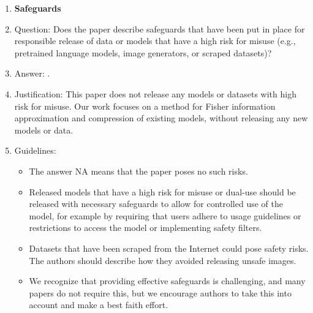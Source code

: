 \documentclass{article}
\begin{document}
{\begin{enumerate}
\item {\bf Safeguards}
    \item[] Question: Does the paper describe safeguards that have been put in place for responsible release of data or models that have a high risk for misuse (e.g., pretrained language models, image generators, or scraped datasets)?
    \item[] Answer: \answerNA{}.
    \item[] Justification: This paper does not release any models or datasets with high risk for misuse. Our work focuses on a method for Fisher information approximation and compression of existing models, without releasing any new models or data.
    \item[] Guidelines:
    \begin{itemize}
        \item The answer NA means that the paper poses no such risks.
        \item Released models that have a high risk for misuse or dual-use should be released with necessary safeguards to allow for controlled use of the model, for example by requiring that users adhere to usage guidelines or restrictions to access the model or implementing safety filters. 
        \item Datasets that have been scraped from the Internet could pose safety risks. The authors should describe how they avoided releasing unsafe images.
        \item We recognize that providing effective safeguards is challenging, and many papers do not require this, but we encourage authors to take this into account and make a best faith effort.
    \end{itemize}


\end{enumerate}}
\end{document}
